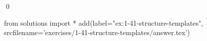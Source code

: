 
\begin{ex}
  \label{ex:1-41-structure-templates}
  
  \qed
\end{ex}
\begin{python0}
from solutions import *
add(label="ex:1-41-structure-templates",
    srcfilename='exercises/1-41-structure-templates/answer.tex')
\end{python0}
